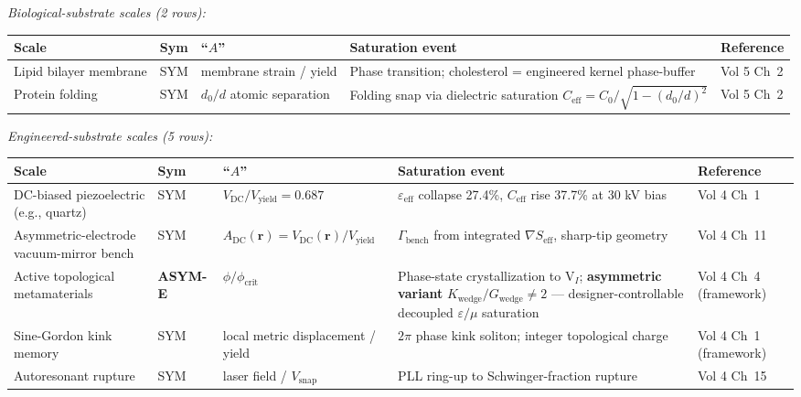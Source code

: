 \textit{Biological-substrate scales (2 rows):}
\begin{center}
\scriptsize
\begin{tabular}{|p{2.4cm}|p{0.8cm}|p{2.6cm}|p{4.0cm}|p{2.8cm}|}
\hline
\textbf{Scale} & \textbf{Sym} & \textbf{``$A$''} & \textbf{Saturation event} & \textbf{Reference} \\
\hline
Lipid bilayer membrane & SYM & membrane strain / yield & Phase transition; cholesterol = engineered kernel phase-buffer & Vol 5 Ch~2 \\
\hline
Protein folding & SYM & $d_0 / d$ atomic separation & Folding snap via dielectric saturation $C_{\text{eff}} = C_0/\sqrt{1-(d_0/d)^2}$ & Vol 5 Ch~2 \\
\hline
\end{tabular}
\end{center}

\textit{Engineered-substrate scales (5 rows):}
\begin{center}
\scriptsize
\begin{tabular}{|p{2.5cm}|p{0.9cm}|p{2.7cm}|p{4.3cm}|p{3.3cm}|}
\hline
\textbf{Scale} & \textbf{Sym} & \textbf{``$A$''} & \textbf{Saturation event} & \textbf{Reference} \\
\hline
DC-biased piezoelectric (e.g., quartz) & SYM & $V_{\text{DC}}/V_{\text{yield}} = 0.687$ & $\varepsilon_{\text{eff}}$ collapse 27.4\%, $C_{\text{eff}}$ rise 37.7\% at 30 kV bias & Vol 4 Ch~1 \\
\hline
Asymmetric-electrode vacuum-mirror bench & SYM & $A_{\text{DC}}(\mathbf{r}) = V_{\text{DC}}(\mathbf{r})/V_{\text{yield}}$ & $\Gamma_{\text{bench}}$ from integrated $\nabla S_{\text{eff}}$, sharp-tip geometry & Vol 4 Ch~11 \\
\hline
Active topological metamaterials & \textbf{ASYM-E} & $\phi / \phi_{\text{crit}}$ & Phase-state crystallization to V$_I$; \textbf{asymmetric variant} $K_{\text{wedge}}/G_{\text{wedge}} \neq 2$ --- designer-controllable decoupled $\varepsilon/\mu$ saturation & Vol 4 Ch~4 (framework) \\
\hline
Sine-Gordon kink memory & SYM & local metric displacement / yield & $2\pi$ phase kink soliton; integer topological charge & Vol 4 Ch~1 (framework) \\
\hline
Autoresonant rupture & SYM & laser field / $V_{\text{snap}}$ & PLL ring-up to Schwinger-fraction rupture & Vol 4 Ch~15 \\
\hline
\end{tabular}
\end{center}

